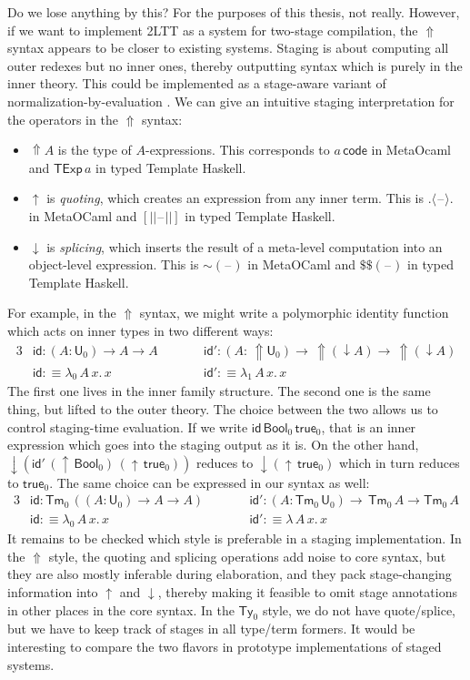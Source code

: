 \documentclass[12pt,a4paper,twoside,openany]{book}
\theoremstyle{remark}
\theoremstyle{definition}
\theoremstyle{theorem}
\newcommand{\ms}[1]{\mathsf{#1}}
\newcommand{\id}{\mathsf{id}}
\newcommand{\Tm}{\mathsf{Tm}}
\newcommand{\Ty}{\mathsf{Ty}}
\newcommand{\U}{\mathsf{U}}
\newcommand{\blank}{\mathord{\hspace{1pt}\text{--}\hspace{1pt}}}
\newcommand{\Lift}{\Uparrow}
\newcommand{\Bool}{\ms{Bool}}
\newcommand{\true}{\ms{true}}
\newcommand{\up}{\uparrow}
\newcommand{\down}{\downarrow}
\newcommand{\lab}{\langle}
\newcommand{\rab}{\rangle}
\newcommand{\defn}{:\equiv}
\begin{document}
Do we lose anything by this? For the purposes of this thesis, not
really. However, if we want to implement 2LTT as a system for two-stage
compilation, the $\Lift$ syntax appears to be closer to existing systems.
Staging is about computing all outer redexes but no inner ones, thereby
outputting syntax which is purely in the inner theory. This could be implemented
as a stage-aware variant of normalization-by-evaluation
\cite{abel2013normalization,decidableconv,coqnbe}. We can give an intuitive
staging interpretation for the operators in the $\Lift$ syntax:
\begin{itemize}
\item
  $\Lift\!A$ is the type of $A$-expressions. This corresponds to $a\,\ms{code}$
  in MetaOcaml \cite{kiselyov14metaocaml} and $\ms{TExp}\,a$ in typed Template Haskell.
\item
  $\up$ is \emph{quoting}, which creates an expression from any inner term. This is
  $.\lab\blank\rab.$ in MetaOCaml and $[||\blank||]$ in typed Template Haskell.
\item $\down$ is \emph{splicing}, which inserts the result of a meta-level computation into
  an object-level expression. This is $\sim\!(\blank)$ in MetaOCaml and $\$\$(\blank)$ in typed Template Haskell.
\end{itemize}
For example, in the $\Lift$ syntax, we might write a polymorphic identity function
which acts on inner types in two different ways:
\begin{alignat*}{3}
  &\id : (A : \U_0) \to A \to A\hspace{2em} && \id' : (A :\,\Lift\!\U_0) \to\,\Lift\!(\down A) \to\,\Lift\!(\down A)\\
  &\id \defn \lambda_0\,A\,x.\,x && \id' \defn \lambda_1\,A\,x.\,x
\end{alignat*}
The first one lives in the inner family structure. The second one is the same
thing, but lifted to the outer theory. The choice between the two allows us to
control staging-time evaluation. If we write $\id\,\Bool_0\,\true_0$, that is an
inner expression which goes into the staging output as it is. On the other hand,
$\down(\id'\,(\up\,\Bool_0)\,(\up\,\true_0))$ reduces to $\down(\up\,\true_0)$
which in turn reduces to $\true_0$. The same choice can be expressed in our
syntax as well:
\begin{alignat*}{3}
  &\id : \Tm_0\,((A : \U_0) \to A \to A)\hspace{2em}&&\id' : (A : \Tm_0\,\U_0) \to\,\Tm_0\,A \to \Tm_0\,A\\
  &\id \defn \lambda_0\,A\,x.\,x &&\id' \defn \lambda\,A\,x.\,x
\end{alignat*}
It remains to be checked which style is preferable in a staging
implementation. In the $\Lift$ style, the quoting and splicing operations add
noise to core syntax, but they are also mostly inferable during elaboration, and
they pack stage-changing information into $\up$ and $\down$, thereby making it
feasible to omit stage annotations in other places in the core syntax. In the
$\Ty_0$ style, we do not have quote/splice, but we have to keep track of stages
in all type/term formers. It would be interesting to compare the two flavors
in prototype implementations of staged systems.
\end{document}

